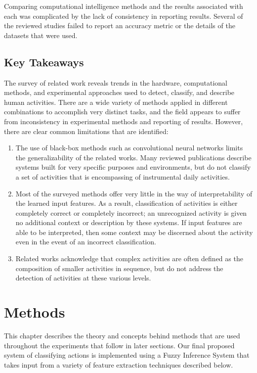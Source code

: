 \documentclass[12pt]{report}
\begin{document}
Comparing computational intelligence methods and the results associated with each was complicated by the lack of consistency in reporting results. Several of the reviewed studies failed to report an accuracy metric or the details of the datasets that were used.

\section{Key Takeaways}
The survey of related work reveals trends in the hardware, computational methods, and experimental approaches used to detect, classify, and describe human activities. There are a wide variety of methods applied in different combinations to accomplish very distinct tasks, and the field appears to suffer from inconsistency in experimental methods and reporting of results. However, there are clear common limitations that are identified:
\begin{enumerate}
    \item The use of black-box methods such as convolutional neural networks limits the generalizability of the related works. Many reviewed publications describe systems built for very specific purposes and environments, but do not classify a set of activities that is encompassing of instrumental daily activities.
    \item Most of the surveyed methods offer very little in the way of interpretability of the learned input features. As a result, classification of activities is either completely correct or completely incorrect; an unrecognized activity is given no additional context or description by these systems. If input features are able to be interpreted, then some context may be discerned about the activity even in the event of an incorrect classification.
    \item Related works acknowledge that complex activities are often defined as the composition of smaller activities in sequence, but do not address the detection of activities at these various levels.
\end{enumerate}

\chapter{Methods}

This chapter describes the theory and concepts behind methods that are used throughout the experiments that follow in later sections. Our final proposed system of classifying actions is implemented using a Fuzzy Inference System that takes input from a variety of feature extraction techniques described below.
\end{document}
